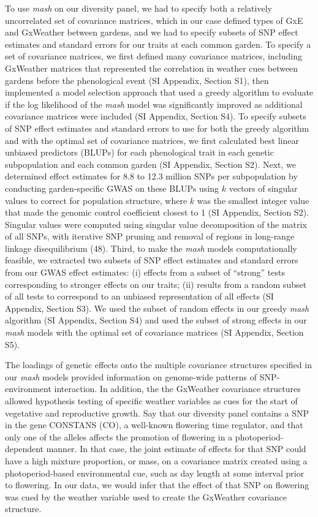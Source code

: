 \documentclass[
  9pt,
  twocolumn,
  twoside]{pnas-new}
\begin{document}
To use \emph{mash} on our diversity panel, we had to specify both a
relatively uncorrelated set of covariance matrices, which in our case
defined types of GxE and GxWeather between gardens, and we had to
specify subsets of SNP effect estimates and standard errors for our
traits at each common garden. To specify a set of covariance matrices,
we first defined many covariance matrices, including GxWeather matrices
that represented the correlation in weather cues between gardens before
the phenological event (SI Appendix, Section S1), then implemented a
model selection approach that used a greedy algorithm to evaluate if the
log likelihood of the \emph{mash} model was significantly improved as
additional covariance matrices were included (SI Appendix, Section S4).
To specify subsets of SNP effect estimates and standard errors to use
for both the greedy algorithm and with the optimal set of covariance
matrices, we first calculated best linear unbiased predictors (BLUPs)
for each phenological trait in each genetic subpopulation and each
common garden (SI Appendix, Section S2). Next, we determined effect
estimates for 8.8 to 12.3 million SNPs per subpopulation by conducting
garden-specific GWAS on these BLUPs using \(k\) vectors of singular
values to correct for population structure, where \(k\) was the smallest
integer value that made the genomic control coefficient closest to 1 (SI
Appendix, Section S2). Singular values were computed using singular
value decomposition of the matrix of all SNPs, with iterative SNP
pruning and removal of regions in long-range linkage disequilibrium
(48). Third, to make the \emph{mash} models computationally feasible, we
extracted two subsets of SNP effect estimates and standard errors from
our GWAS effect estimates: (i) effects from a subset of ``strong'' tests
corresponding to stronger effects on our traits; (ii) results from a
random subset of all tests to correspond to an unbiased representation
of all effects (SI Appendix, Section S3). We used the subset of random
effects in our greedy \emph{mash} algorithm (SI Appendix, Section S4)
and used the subset of strong effects in our \emph{mash} models with the
optimal set of covariance matrices (SI Appendix, Section S5).

The loadings of genetic effects onto the multiple covariance structures
specified in our \emph{mash} models provided information on genome-wide
patterns of SNP-environment interaction. In addition, the the GxWeather
covariance structures allowed hypothesis testing of specific weather
variables as cues for the start of vegetative and reproductive growth.
Say that our diversity panel contains a SNP in the gene CONSTANS (CO), a
well-known flowering time regulator, and that only one of the alleles
affects the promotion of flowering in a photoperiod-dependent manner. In
that case, the joint estimate of effects for that SNP could have a high
mixture proportion, or mass, on a covariance matrix created using a
photoperiod-based environmental cue, such as day length at some interval
prior to flowering. In our data, we would infer that the effect of that
SNP on flowering was cued by the weather variable used to create the
GxWeather covariance structure.
\end{document}
